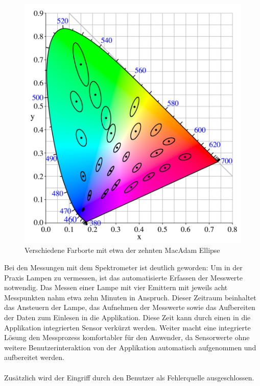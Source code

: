 \documentclass[11pt]{scrartcl}
\begin{document}
\begin{figure}[H]
    \begin{center}
        \includegraphics[width=.8\textwidth]{images/CIExy1931MacAdam.png}
    \end{center}
    \vspace{-.4cm}
    \caption[Verschiedene Farborte mit etwa der zehnten MacAdam Ellipse]{Verschiedene Farborte mit etwa der zehnten MacAdam Ellipse \cite{macAdam}} \label{fig:macAdamExample}
\end{figure}
\noindent
Bei den Messungen mit dem Spektrometer ist deutlich geworden: Um in der Praxis Lampen zu vermessen, ist das automatisierte Erfassen der Messwerte notwendig. Das
Messen einer Lampe mit vier Emittern mit jeweils acht Messpunkten nahm etwa zehn Minuten in Anspruch. Dieser Zeitraum beinhaltet das Ansteuern der Lampe, das
Aufnehmen der Messwerte sowie das Aufbereiten der Daten zum Einlesen in die Applikation. Diese Zeit kann durch einen in die Applikation integrierten Sensor verkürzt
werden. Weiter macht eine integrierte Lösung den Messprozess komfortabler für den Anwender, da Sensorwerte ohne weitere Benutzerinteraktion von der Applikation
automatisch aufgenommen und aufbereitet werden.\\
\\
Zusätzlich wird der Eingriff durch den Benutzer als Fehlerquelle ausgeschlossen.
\end{document}
